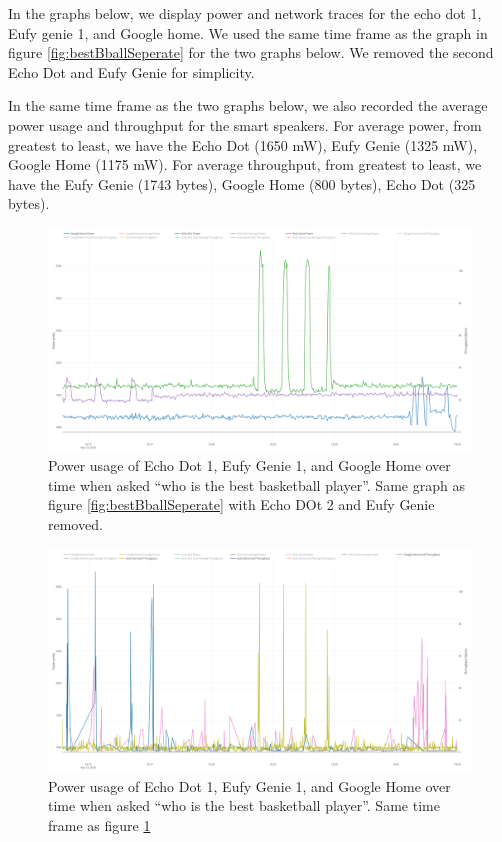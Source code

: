 In the graphs below, we display power and network traces for the echo dot 1, Eufy genie 1, and Google home. We used the same time frame as the graph in figure \ref{fig:bestBballSeperate} for the two graphs below. We removed the second Echo Dot and Eufy Genie for simplicity.

In the same time frame as the two graphs below, we also recorded the average power usage and throughput for the smart speakers. For average power, from greatest to least, we have the Echo Dot (1650 mW), Eufy Genie (1325 mW), Google Home (1175 mW). For average throughput, from greatest to least, we have the Eufy Genie (1743 bytes), Google Home (800 bytes), Echo Dot (325 bytes).

\begin{figure}[H]
  \centering
  \includegraphics[width=1\textwidth]{figures/smartSpeakerSeperate.png}
  \caption{Power usage of Echo Dot 1, Eufy Genie 1, and Google Home over time when asked ``who is the best basketball player''. Same graph as figure \ref{fig:bestBballSeperate} with Echo DOt 2 and Eufy Genie removed.}
  \label{fig:smartSpeakerSeperate}
\end{figure}

\begin{figure}[H]
  \centering
  \includegraphics[width=1\textwidth]{figures/smartSpeakerNetworkSeperate.png}
  \caption{Power usage of Echo Dot 1, Eufy Genie 1, and Google Home over time when asked ``who is the best basketball player''. Same time frame as figure \ref{fig:smartSpeakerSeperate}}
  \label{fig:smartSpeakerNetworkSeperate}
\end{figure}
